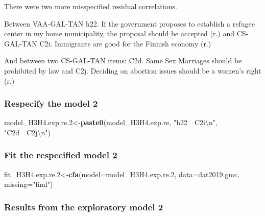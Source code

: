 \documentclass[
]{article}
\newenvironment{Shaded}{\begin{snugshade}}{\end{snugshade}}
\newcommand{\CharTok}[1]{\textcolor[rgb]{0.31,0.60,0.02}{#1}}
\newcommand{\DataTypeTok}[1]{\textcolor[rgb]{0.13,0.29,0.53}{#1}}
\newcommand{\FloatTok}[1]{\textcolor[rgb]{0.00,0.00,0.81}{#1}}
\newcommand{\KeywordTok}[1]{\textcolor[rgb]{0.13,0.29,0.53}{\textbf{#1}}}
\newcommand{\NormalTok}[1]{#1}
\newcommand{\StringTok}[1]{\textcolor[rgb]{0.31,0.60,0.02}{#1}}
\begin{document}
There were two more misspecified residual correlations.

Between VAA-GAL-TAN h22. If the government proposes to establish a
refugee center in my home municipality, the proposal should be accepted
(r.) and CS-GAL-TAN C2i. Immigrants are good for the Finnish economy
(r.)

And between two CS-GAL-TAN items: C2d. Same Sex Marriages should be
prohibited by law and C2j. Deciding on abortion issues should be a
women's right (r.)

\hypertarget{respecify-the-model-2}{%
\subsubsection{Respecify the model 2}\label{respecify-the-model-2}}

\begin{Shaded}
\begin{Highlighting}[]
\NormalTok{model_H3H4.exp.re}\FloatTok{.2}\NormalTok{<-}\KeywordTok{paste0}\NormalTok{(model_H3H4.exp.re,}
                      \StringTok{"h22~~C2i}\CharTok{\textbackslash{}n}\StringTok{"}\NormalTok{,}
                      \StringTok{"C2d~~C2j}\CharTok{\textbackslash{}n}\StringTok{"}\NormalTok{)}
\end{Highlighting}
\end{Shaded}

\hypertarget{fit-the-respecified-model-2}{%
\subsubsection{Fit the respecified model
2}\label{fit-the-respecified-model-2}}

\begin{Shaded}
\begin{Highlighting}[]
\NormalTok{fit_H3H4.exp.re}\FloatTok{.2}\NormalTok{<-}\KeywordTok{cfa}\NormalTok{(}\DataTypeTok{model=}\NormalTok{model_H3H4.exp.re}\FloatTok{.2}\NormalTok{,}
              \DataTypeTok{data=}\NormalTok{dat2019.gmc,}
              \DataTypeTok{missing=}\StringTok{"fiml"}\NormalTok{)}
\end{Highlighting}
\end{Shaded}

\hypertarget{results-from-the-exploratory-model-2}{%
\subsubsection{Results from the exploratory model
2}\label{results-from-the-exploratory-model-2}}
\end{document}
